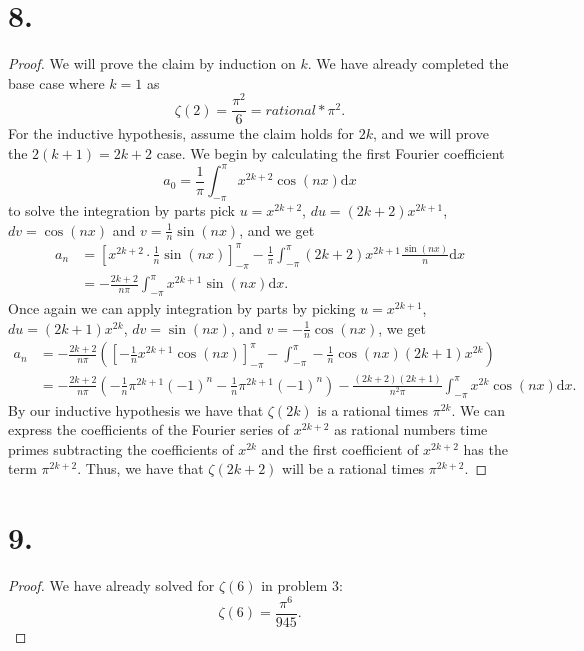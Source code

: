 \documentclass{article}
\begin{document}
\section*{8.}
\begin{proof}
  We will prove the claim by induction on $k$. We have already completed the base case where $k = 1$ as 
  \[
  \zeta(2) = \frac{\pi^2}{6}  = rational*\pi^2.  
  \]
  For the inductive hypothesis, assume the claim holds for $2k$, and we will prove the $2(k + 1) = 2k + 2$ case. We begin by calculating the first Fourier coefficient 
  \[
  a_0 = \frac{1}{\pi}\int_{-\pi}^{\pi} x^{2k + 2}\cos(nx) \mathrm{d}x  
  \]
  to solve the integration by parts pick $u = x^{2k + 2}$, $du = (2k + 2)x^{2k + 1}$, $dv = \cos(nx)$ and $v = \frac{1}{n}\sin(nx)$, and we get
  \begin{align*}
    a_n &= \left[x^{2k + 2}\cdot \frac{1}{n}\sin(nx) \right]_{-\pi}^{\pi} - \frac{1 }{\pi} \int_{-\pi}^{\pi} (2k + 2)x^{2k + 1}\frac{\sin(nx)}{n}\mathrm{d}x \\
    &= -\frac{2k + 2}{n \pi}\int_{-\pi}^{\pi}x^{2k + 1} \sin(nx) \mathrm{d}x.
  \end{align*}
  Once again we can apply integration by parts by picking $u = x^{2k + 1}$, $du = (2k + 1)x^{2k}$, $dv = \sin(nx)$, and $v = -\frac{1}{n}\cos(nx)$, we get
  \begin{align*}
    a_n &= -\frac{2k + 2}{n \pi }\left(\left[-\frac{1}{n}x^{2k + 1}\cos(nx) \right]_{-\pi}^{\pi} - \int_{-\pi}^{\pi} -\frac{1}{n}\cos(nx) (2k + 1)x^{2k} \right) \\
    &= -\frac{2k + 2}{n \pi}\left(-\frac{1}{n}\pi^{2k + 1}(-1)^n - \frac{1}{n}\pi^{2k +1}(-1)^n \right) - \frac{(2k + 2)(2k + 1)}{n^2 \pi}\int_{-\pi}^{\pi}x^{2k}\cos(nx) \mathrm{d}x.
  \end{align*}
  By our inductive hypothesis we have that $\zeta(2k)$ is a rational times $\pi^{2k}$. We can express the coefficients of the Fourier series of $x^{2k + 2}$ as rational numbers time primes subtracting the coefficients of $x^{2k}$ and the first coefficient of $x^{2k + 2}$ has the term $\pi^{2k + 2}$. Thus, we have that $\zeta(2k + 2)$ will be a rational times $\pi^{2k + 2}$. 
\end{proof}
\section*{9.}
\begin{proof}
  We have already solved for $\zeta(6)$ in problem 3:
  \[
  \zeta(6) = \frac{\pi^6}{945}.  
  \]
\end{proof}
\end{document}

